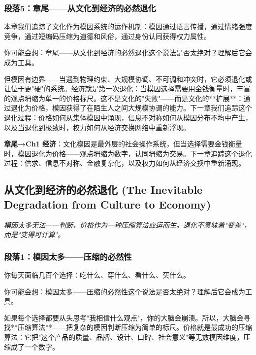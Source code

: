 \documentclass[a4paper,12pt]{book}
\newenvironment{motivation}{\begin{tcolorbox}[colback=gray!10,colframe=gray!60,title=\textit{动机}]\small\itshape}{\end{tcolorbox}}
\begin{document}
\begin{motivation}
\begin{motivation}
\begin{motivation}
	\subsubsection*{段落5：章尾——从文化到经济的必然退化}
	本章我们追踪了文化作为模因系统的运作机制：模因通过语言传播，通过情绪强度竞争，通过短编码压缩为道德和风俗，通过身份认同获得权力属性。
	\begin{tcolorbox}[colback=yellow!5, title=\textit{读者行为预测}]
		你可能会想：章尾——从文化到经济的必然退化这个说法是否太绝对？理解后它会成为工具。
	\end{tcolorbox}

但模因有边界——当遇到物理约束、大规模协调、不可调和冲突时，它必须退化或让位于更"硬"的系统。经济就是第一次退化：当模因选择需要用金钱衡量时，丰富的观点坍缩为单一的价格标尺。这不是文化的"失败"——而是文化的**扩展**：通过退化为价格，模因获得了在陌生人之间大规模协调的能力。下一章我们追踪这个退化过程：价格如何从集体模因中涌现，信息不对称如何从模因分布不均中产生，以及当退化到极致时，权力如何从经济交换网络中重新浮现。

	\textbf{章尾→Ch1 经济}：文化模因是最外层的社会操作系统，但当选择需要金钱衡量时，模因退化为价格——观点坍缩为数字，认同坍缩为交易。下一章追踪这个退化过程：供求、信息不对称、金融复杂化，以及权力如何从经济交换中重新涌现。



	\subsection{从文化到经济的必然退化 (The Inevitable Degradation from Culture to Economy)}
	\begin{motivation}
		模因太多无法一一判断，价格作为一种压缩算法应运而生。退化不意味着"变差"，而是"变得可计算"。
	\end{motivation}

	\subsubsection*{段落1：模因太多——压缩的必然性}
	你每天面临几百个选择：吃什么、穿什么、看什么、买什么。
	\begin{tcolorbox}[colback=yellow!5, title=\textit{读者行为预测}]
		你可能会想：模因太多——压缩的必然性这个说法是否太绝对？理解后它会成为工具。
	\end{tcolorbox}

如果每个选择都要从头思考"我相信什么观点"，你的大脑会崩溃。所以，大脑会寻找**压缩算法**——把复杂的模因判断压缩为简单的标尺。价格就是最成功的压缩算法：它把"这个产品的质量、品牌、设计、口碑、社会意义"等无数模因维度，压缩成了一个数字。


\end{motivation}
\end{motivation}
\end{motivation}
\end{document}
